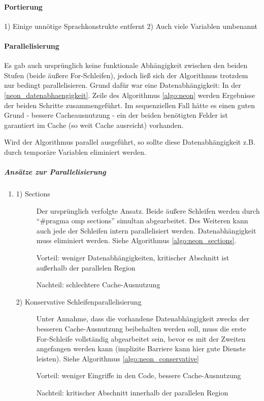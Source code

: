 \paragraph{Portierung}
\label{neon_portierung}
1) Einige unnötige Sprachkonstrukte entfernt
2) Auch viele Variablen umbenannt

\paragraph{Parallelisierung}
Es gab auch ursprünglich keine funktionale Abhängigkeit zwischen den beiden Stufen (beide äußere For-Schleifen),  jedoch ließ sich der Algorithmus trotzdem nur bedingt parallelisieren. Grund dafür war eine Datenabhängigkeit: In der \ref{neon_datenabhaengigkeit}. Zeile des Algorithmus \ref{algo:neon} werden Ergebnisse der beiden Schritte zusammengeführt. Im sequenziellen Fall hätte es einen guten Grund - bessere Cacheausnutzung - ein der beiden benötigten Felder ist garantiert im Cache (so weit Cache ausreicht) vorhanden.

Wird der Algorithmus parallel ausgeführt, so sollte diese Datenabhängigkeit z.B. durch temporäre Variablen eliminiert werden. 

\newpage
\subparagraph{Ansätze zur Parallelisierung}
\begin{enumerate}
	\item [] \begin{description} %
		\item[1) Sections] Der ursprünglich verfolgte Ansatz. Beide äußere Schleifen werden durch ``\#pragma omp sections'' simultan abgearbeitet. Des Weiteren kann auch jede der Schleifen intern parallelisiert werden. Datenabhängigkeit muss eliminiert werden. Siehe Algorithmus \ref{algo:neon_sections}.
		
		Vorteil: weniger Datenabhängigkeiten, kritischer Abschnitt ist außerhalb der parallelen Region
		
		Nachteil: schlechtere Cache-Ausnutzung
		\item[2) Konservative Schleifenparallelisierung] Unter Annahme, dass die vorhandene Datenabhängigkeit zwecks der besseren Cache-Ausnutzung beibehalten werden soll, muss die erste For-Schleife vollständig abgearbeitet sein, bevor es mit der Zweiten angefangen werden kann (implizite Barriere kann hier gute Dienste leisten). Siehe Algorithmus \ref{algo:neon_conservative}
		
		Vorteil: weniger Eingriffe in den Code, bessere Cache-Ausnutzung
		
		Nachteil: kritischer Abschnitt innerhalb der parallelen Region 
	\end{description}
\end{enumerate}

